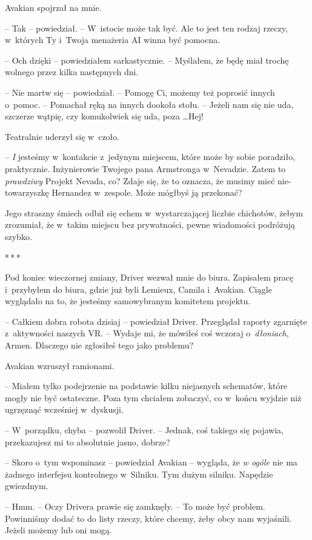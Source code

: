 \documentclass[oneside,polish,12pt,sfheadings]{mwbk}
\newcommand{\threeast}{\bigskip\par\centerline{*\,*\,*}\medskip\par}%
\begin{document}
Avakian spojrzał na mnie. 

-- Tak -- powiedział. -- W~istocie może tak być.
Ale to jest ten rodzaj rzeczy, w~których Ty i~Twoja menażeria AI winna
być pomocna.

-- Och dzięki -- powiedziałem sarkastycznie. -- Myślałem, że będę miał
trochę wolnego przez kilka następnych dni.

-- Nie martw się -- powiedział. -- Pomogę Ci, możemy też poprosić innych o~pomoc. -- Pomachał ręką na innych dookoła stołu. -- Jeżeli nam się nie uda,
szczerze wątpię, czy komukolwiek się uda, poza \ldots Hej!

Teatralnie uderzył się w~czoło.

-- \emph{I} jesteśmy w~kontakcie z~jedynym miejscem, które może by sobie
poradziło, praktycznie. Inżynierowie Twojego pana Armstronga w~Nevadzie.
Zatem to \emph{prawdziwy } Projekt Nevada, co? Zdaje się, że to oznacza,
że musimy mieć nie-towarzyszkę Hernandez w~zespole. Może mógłbyś ją
przekonać?

Jego straszny śmiech odbił się echem w~wystarczającej liczbie chichotów,
żebym zrozumiał, że w~takim miejscu bez prywatności, pewne wiadomości
podróżują szybko.

\threeast

Pod koniec wieczornej zmiany, Driver wezwał mnie do biura. Zapisałem
pracę i~przybyłem do biura, gdzie już byli Lemieux, Camila i~Avakian.
Ciągle wyglądało na to, że jesteśmy samowybranym komitetem projektu.

-- Całkiem dobra robota dzisiaj -- powiedział Driver. Przeglądał raporty
zgarnięte z~aktywności naszych VR. -- Wydaje mi, że mówiłeś coś wczoraj o~\emph{dłoniach}, Armen. Dlaczego nie zgłosiłeś tego jako problemu?

Avakian wzruszył ramionami. 

-- Miałem tylko podejrzenie na podstawie
kilku niejasnych schematów, które mogły nie być ostateczne. Poza tym
chciałem zobaczyć, co w~końcu wyjdzie niż ugrzęznąć wcześniej w~dyskusji.

-- W~porządku, chyba -- pozwolił Driver. -- Jednak, coś takiego się
pojawia, przekazujesz mi to absolutnie jasno, dobrze?

-- Skoro o~tym wspominasz -- powiedział Avakian -- wygląda, że \emph{w
ogóle} nie ma żadnego interfejsu kontrolnego w~Silniku. Tym dużym
silniku. Napędzie gwiezdnym.

-- Hmm. -- Oczy Drivera prawie się zamknęły. -- To może być problem.
Powinniśmy dodać to do listy rzeczy, które chcemy, żeby obcy nam
wyjaśnili. Jeżeli możemy lub oni mogą.
\end{document}
